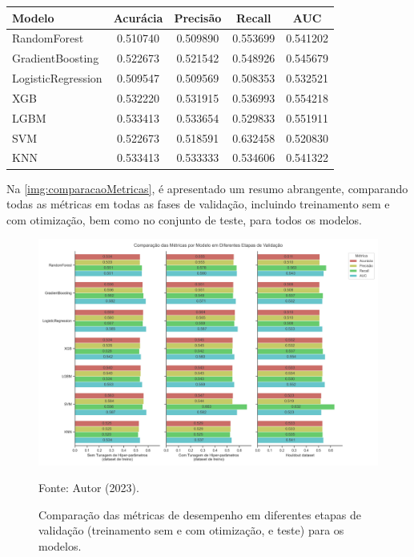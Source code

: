 \begin{table}
	{
		\begin{tabular}{lcccc}
			\toprule
			\textbf{Modelo} & \textbf{Acurácia} & \textbf{Precisão} & \textbf{Recall} & \textbf{AUC} \\
			\midrule \midrule
			RandomForest & 0.510740 & 0.509890 & 0.553699 & 0.541202 \\
			\midrule
			GradientBoosting & 0.522673 & 0.521542 & 0.548926 & 0.545679 \\
			\midrule
			LogisticRegression & 0.509547 & 0.509569 & 0.508353 & 0.532521 \\
			\midrule
			XGB & 0.532220 & 0.531915 & 0.536993 & 0.554218 \\
			\midrule
			LGBM & 0.533413 & 0.533654 & 0.529833 & 0.551911 \\
			\midrule
			SVM & 0.522673 & 0.518591 & 0.632458 & 0.520830 \\
			\midrule
			KNN & 0.533413 & 0.533333 & 0.534606 & 0.541322 \\
			\bottomrule
		\end{tabular}
	}
	{
	}
\end{table}

Na \autoref{img:comparacaoMetricas}, é apresentado um resumo abrangente, comparando todas as métricas em todas as fases de validação, incluindo treinamento sem e com otimização, bem como no conjunto de teste, para todos os modelos.

\begin{figure}
	\centering
	\caption{\label{img:comparacaoMetricas}Comparação das métricas de desempenho em diferentes etapas de validação (treinamento sem e com otimização, e teste) para os modelos.}
	\includegraphics[scale=0.5]{USPSC-img/comparacao_metricas_por_modelo.png}
	\begin{center}
		Fonte: Autor (2023).
	\end{center}
\end{figure}

